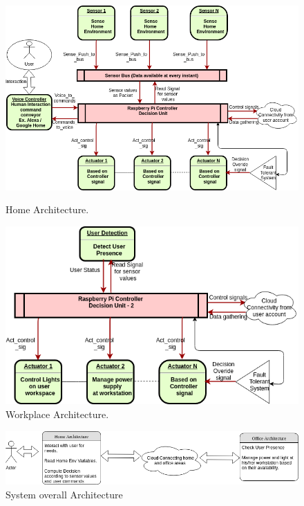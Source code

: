 \documentclass[runningheads]{llncs}
\begin{document}
\begin{figure}
  \centering
  \begin{minipage}[b]{0.55\textwidth}
    \includegraphics[width=\textwidth]{Home_Architecture.png}
    \caption{Home Architecture.}
  \end{minipage}
  \hfill
  \begin{minipage}[b]{0.4\textwidth}
    \includegraphics[width=\textwidth]{Office_Architecture-Page-1.png}
    \caption{Workplace Architecture.}
  \end{minipage}
\end{figure}

\begin{figure}
        \centering
        \includegraphics[width=1\textwidth]{System_Architecture.png}
        \caption{System overall Architecture}
        \label{fig:correctness}
    \end{figure}
\end{document}
